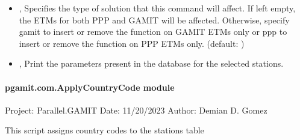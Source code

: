 \documentclass[letterpaper,10pt,english]{sphinxmanual}
\begin{document}
\begin{itemize}
\item {} 
\sphinxAtStartPar
{\hyperref[\detokenize{pgamit.com:AlterETM.py--soln}]{}} , {\hyperref[\detokenize{pgamit.com:AlterETM.py---solution_type}]{}}  \sphinxhyphen{} Specifies the type of solution that this command will affect. If left empty, the ETMs for both PPP and GAMIT will be affected. Otherwise, specify gamit to insert or remove the function on GAMIT ETMs only or ppp to insert or remove the function on PPP ETMs only. (default: )

\item {} 
\sphinxAtStartPar
{\hyperref[\detokenize{pgamit.com:AlterETM.py--print}]{}}, {\hyperref[\detokenize{pgamit.com:AlterETM.py---print_params}]{}} \sphinxhyphen{} Print the parameters present in the database for the selected stations.

\end{itemize}


\paragraph{pgamit.com.ApplyCountryCode module}
\label{\detokenize{pgamit.com:module-pgamit.com.ApplyCountryCode}}\label{\detokenize{pgamit.com:pgamit-com-applycountrycode-module}}
\sphinxAtStartPar
Project: Parallel.GAMIT
Date: 11/20/2023
Author: Demian D. Gomez

\sphinxAtStartPar
This script assigns country codes to the stations table

\begin{fulllineitems}
\label{\detokenize{pgamit.com:pgamit.com.ApplyCountryCode.main}}
\pysigstartsignatures
\pysiglinewithargsret
{}
{}
{}
\pysigstopsignatures
\end{fulllineitems}
\end{document}
